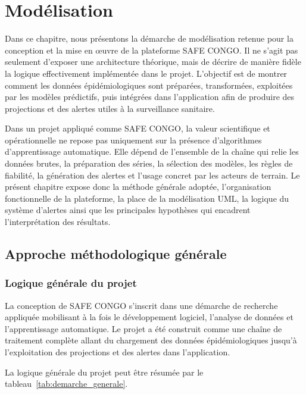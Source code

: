 \chapter{Modélisation}

Dans ce chapitre, nous présentons la démarche de modélisation retenue pour la conception et la mise en \oe{}uvre de la plateforme SAFE CONGO. Il ne s'agit pas seulement d'exposer une architecture théorique, mais de décrire de manière fidèle la logique effectivement implémentée dans le projet. L'objectif est de montrer comment les données épidémiologiques sont préparées, transformées, exploitées par les modèles prédictifs, puis intégrées dans l'application afin de produire des projections et des alertes utiles à la surveillance sanitaire.

Dans un projet appliqué comme SAFE CONGO, la valeur scientifique et opérationnelle ne repose pas uniquement sur la présence d'algorithmes d'apprentissage automatique. Elle dépend de l'ensemble de la chaîne qui relie les données brutes, la préparation des séries, la sélection des modèles, les règles de fiabilité, la génération des alertes et l'usage concret par les acteurs de terrain. Le présent chapitre expose donc la méthode générale adoptée, l'organisation fonctionnelle de la plateforme, la place de la modélisation UML, la logique du système d'alertes ainsi que les principales hypothèses qui encadrent l'interprétation des résultats.

\section{Approche méthodologique générale}

\subsection{Logique générale du projet}

La conception de SAFE CONGO s'inscrit dans une démarche de recherche appliquée mobilisant à la fois le développement logiciel, l'analyse de données et l'apprentissage automatique. Le projet a été construit comme une chaîne de traitement complète allant du chargement des données épidémiologiques jusqu'à l'exploitation des projections et des alertes dans l'application.

La logique générale du projet peut être résumée par le tableau~\ref{tab:demarche_generale}.

